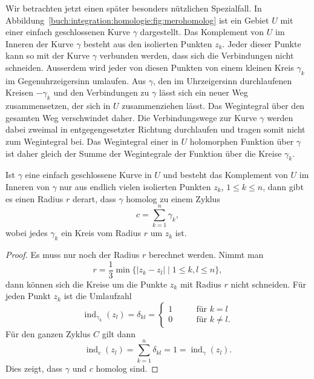 Wir betrachten jetzt einen später besonders nützlichen Spezialfall.
%
In Abbildung~\ref{buch:integration:homologie:fig:merohomolog}
ist ein Gebiet $U$ mit einer einfach geschlossenen Kurve
$\gamma$ dargestellt.
Das Komplement von $U$ im Inneren der Kurve $\gamma$ besteht
aus den isolierten Punkten $z_k$.
Jeder dieser Punkte kann so mit der Kurve $\gamma$ verbunden werden,
dass sich die Verbindungen nicht schneiden.
Ausserdem wird jeder von diesen Punkten von einem kleinen Kreis $\gamma_k$
im Gegenuhrzeigersinn umlaufen.
Aus $\gamma$, den im Uhrzeigersinn durchlaufenen Kreisen $-\gamma_k$
und den Verbindungen zu $\gamma$ lässt sich ein neuer Weg zusammensetzen,
der sich in $U$ zusammenziehen lässt.
Das Wegintegral über den gesamten Weg verschwindet daher.
Die Verbindungswege zur Kurve $\gamma$ werden dabei zweimal in
entgegengesetzter Richtung durchlaufen und tragen somit nicht zum
Wegintegral bei.
Das Wegintegral einer in $U$ holomorphen Funktion über $\gamma$
ist daher gleich der Summe der Wegintegrale der Funktion
über die Kreise $\gamma_k$.

\begin{satz}
\label{buch:integration:homologie:satz:pfadpunkte}
Ist $\gamma$ eine einfach geschlossene Kurve in $U$ und besteht das Komplement
von $U$ im Inneren von $\gamma$ nur aus endlich vielen isolierten Punkten
$z_k$, $1\le k\le n$, dann gibt es einen Radius $r$ derart, dass $\gamma$
homolog zu einem Zyklus 
\[
c
=
\sum_{k=1}^n \gamma_k,
\]
wobei jedes $\gamma_k$ ein Kreis vom Radius $r$ um $z_k$ ist.
\end{satz}

\begin{proof}
Es muss nur noch der Radius $r$ berechnet werden.
Nimmt man
\[
r
=
\frac13
\min \{ |z_k-z_l|\mid 1\le k,l\le n\},
\]
dann können sich die Kreise um die Punkte $z_k$ mit Radius $r$ nicht
schneiden.
Für jeden Punkt $z_k$ ist die Umlaufzahl 
\[
\operatorname{ind}_{\gamma_k}(z_l)
=
\delta_{kl}
=
\begin{cases}
1&\qquad\text{für $k=l$}\\
0&\qquad\text{für $k\ne l$.}
\end{cases}
\]
Für den ganzen Zyklus $C$ gilt dann
\[
\operatorname{ind}_c(z_l)
=
\sum_{k=1}^n
\delta_{kl}
=
1
=
\operatorname{ind}_\gamma(z_l).
\]
Dies zeigt, dass $\gamma$ und $c$ homolog sind.
\end{proof}
